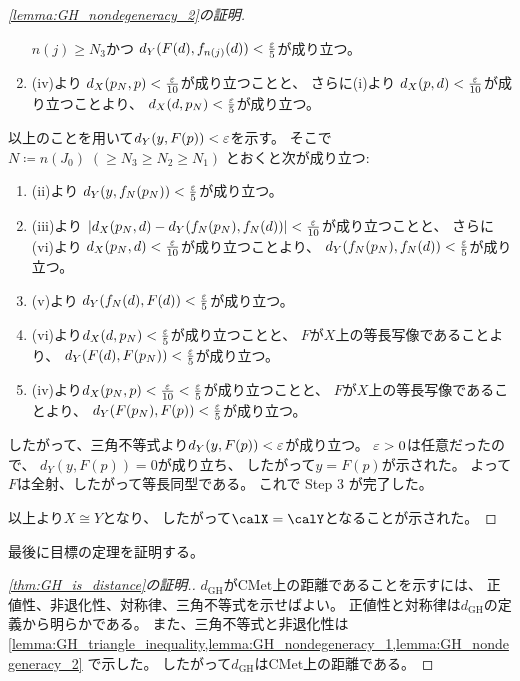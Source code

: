 \documentclass[report, notitlepage]{jlreq}
\newcommand{\CMet}{\mathrm{CMet}}
\newcommand{\GH}{\mathrm{GH}}
\begin{document}
\begin{proof}[\cref{lemma:GH_nondegeneracy_2}の証明]
\begin{enumerate}[label=(\roman*)]
            $n(j) \ge N_3$かつ
            $d_Y(F(d), f_{n(j)}(d)) < \frac{\varepsilon}{5}$が成り立つ。
        \item (iv)より
            $d_X(p_N, p) < \frac{\varepsilon}{10}$が成り立つことと、
            さらに(i)より
            $d_X(p, d) < \frac{\varepsilon}{10}$が成り立つことより、
            $d_X(d, p_N) < \frac{\varepsilon}{5}$が成り立つ。
    \end{enumerate}
    以上のことを用いて$d_Y(y, F(p)) < \varepsilon$を示す。
    そこで$N \coloneqq n(J_0) \; (\ge N_3 \ge N_2 \ge N_1)$
    とおくと次が成り立つ:
    \begin{enumerate}
        \item (ii)より
            $d_Y(y, f_N(p_N)) < \frac{\varepsilon}{5}$が成り立つ。
        \item (iii)より
            $|d_X(p_N, d) - d_Y(f_N(p_N), f_N(d))| < \frac{\varepsilon}{10}$が成り立つことと、
            さらに(vi)より
            $d_X(p_N, d) < \frac{\varepsilon}{10}$が成り立つことより、
            $d_Y(f_N(p_N), f_N(d)) < \frac{\varepsilon}{5}$が成り立つ。
        \item (v)より
            $d_Y(f_N(d), F(d)) < \frac{\varepsilon}{5}$が成り立つ。
        \item (vi)より$d_X(d, p_N) < \frac{\varepsilon}{5}$が成り立つことと、
            $F$が$X$上の等長写像であることより、
            $d_Y(F(d), F(p_N)) < \frac{\varepsilon}{5}$が成り立つ。
        \item (iv)より$d_X(p_N, p) < \frac{\varepsilon}{10} < \frac{\varepsilon}{5}$が成り立つことと、
            $F$が$X$上の等長写像であることより、
            $d_Y(F(p_N), F(p)) < \frac{\varepsilon}{5}$が成り立つ。
    \end{enumerate}
    したがって、三角不等式より$d_Y(y, F(p)) < \varepsilon$が成り立つ。
    $\varepsilon > 0$は任意だったので、
    $d_Y(y, F(p)) = 0$が成り立ち、
    したがって$y = F(p)$が示された。
    よって$F$は全射、したがって等長同型である。
    これで Step 3 が完了した。

    以上より$X \cong Y$となり、
    したがって$\calX = \calY$となることが示された。
\end{proof}

最後に目標の定理を証明する。

\begin{proof}[\cref{thm:GH_is_distance}の証明.]
    $d_\GH$が$\CMet$上の距離であることを示すには、
    正値性、非退化性、対称律、三角不等式を示せばよい。
    正値性と対称律は$d_\GH$の定義から明らかである。
    また、三角不等式と非退化性は
    \cref{lemma:GH_triangle_inequality,lemma:GH_nondegeneracy_1,lemma:GH_nondegeneracy_2}
    で示した。
    したがって$d_\GH$は$\CMet$上の距離である。
\end{proof}
\end{document}

